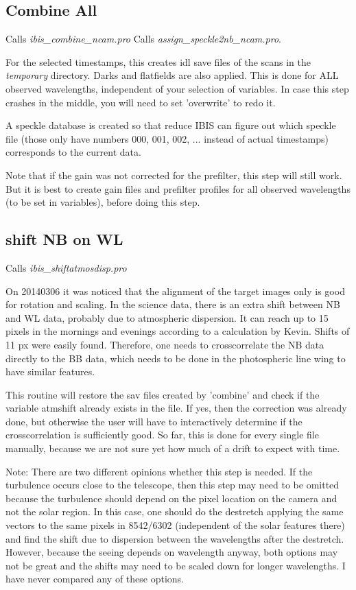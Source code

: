 \documentclass[a4paper,11pt]{article}
\begin{document}
\subsection{Combine All}
Calls \textit{ibis\_combine\_ncam.pro} 
Calls \textit{assign\_speckle2nb\_ncam.pro}.

For the selected timestamps, this creates idl save files of the scans
in the \textit{temporary} directory. Darks and flatfields are also
applied. This is done for ALL observed wavelengths, independent of your selection of variables. In case this step crashes in the middle, you will need to set 'overwrite' to redo it.

A speckle database is created so that reduce IBIS can figure out which
speckle file (those only have numbers 000, 001, 002, ... instead of
actual timestamps) corresponds to the current data.

Note that if the gain was not corrected for the prefilter, this step will still work. But it is best to create gain files and prefilter profiles for all observed wavelengths (to be set in variables), before doing this step.


\subsection{shift NB on WL}
Calls \textit{ibis\_shiftatmosdisp.pro} 

On 20140306 it was noticed that the alignment of the target images only is good for rotation and scaling. In the science data, there is an extra shift between NB and WL data, probably due to atmospheric dispersion. It can reach up to 15 pixels in the mornings and evenings according to a calculation by Kevin. Shifts of 11 px were easily found. Therefore, one needs to crosscorrelate the NB data directly to the BB data, which needs to be done in the photospheric line wing to have similar features. 

This routine will restore the sav files created by 'combine' and check if the variable atmshift already exists in the file. If yes, then the correction was already done, but otherwise the user will have to interactively determine if the crosscorrelation is sufficiently good. So far, this is done for every single file manually, because we are not sure yet how much of a drift to expect with time.

Note: There are two different opinions whether this step is needed. If the turbulence occurs close to the telescope, then this step may need to be omitted because the turbulence should depend on the pixel location on the camera and not the solar region. In this case, one should do the destretch applying the same vectors to the same pixels in 8542/6302 (independent of the solar features there) and find the shift due to dispersion between the wavelengths after the destretch. However, because the seeing depends on wavelength anyway, both options may not be great and the shifts may need to be scaled down for longer wavelengths. I have never compared any of these options.
\end{document}
